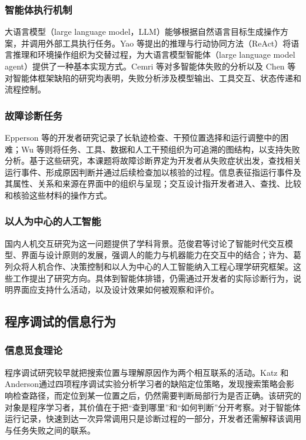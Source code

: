 \subsubsection{智能体执行机制}

大语言模型（large language model，LLM）能够根据自然语言目标生成操作方案，并调用外部工具执行任务。Yao 等\cite{yao2023react}提出的推理与行动协同方法（ReAct）将语言推理和环境操作组织为交替过程，为大语言模型智能体（large language model agent）提供了一种基本实现方式。Cemri 等\cite{cemri2025mast}对多智能体失败的分析以及 Chen 等\cite{ref20}对智能体框架缺陷的研究均表明，失败分析涉及模型输出、工具交互、状态传递和流程控制。

\subsubsection{故障诊断任务}

Epperson 等\cite{ref02}的开发者研究记录了长轨迹检查、干预位置选择和运行调整中的困难；Wu 等\cite{ref23}则将任务、工具、数据和人工干预组织为可追溯的图结构，以支持失败分析。基于这些研究，本课题将故障诊断界定为开发者从失败症状出发，查找相关运行事件、形成原因判断并通过后续检查加以核验的过程。信息表征指运行事件及其属性、关系和来源在界面中的组织与呈现；交互设计指开发者进入、查找、比较和核验这些材料的操作方式。

\subsubsection{以人为中心的人工智能}

国内人机交互研究为这一问题提供了学科背景。范俊君等\cite{ref42}讨论了智能时代交互模型、界面与设计原则的发展，强调人的能力与机器能力在交互中的结合；许为、葛列众\cite{ref63}将人机合作、决策控制和以人为中心的人工智能纳入工程心理学研究框架。这些工作提出了研究方向。具体到智能体排错，仍需通过开发者的实际诊断行为，说明界面应支持什么活动，以及设计效果如何被观察和评价。

\subsection{程序调试的信息行为}

\subsubsection{信息觅食理论}

程序调试研究较早就把搜索位置与理解原因作为两个相互联系的活动。Katz 和 Anderson\cite{ref15}通过四项程序调试实验分析学习者的缺陷定位策略，发现搜索策略会影响检查路径，而定位到某一位置之后，仍然需要判断局部行为是否正确。该研究的对象是程序学习者，其价值在于把“查到哪里”和“如何判断”分开考察。对于智能体运行记录，快速到达一次异常调用只是诊断过程的一部分，开发者还需解释该调用与任务失败之间的联系。

